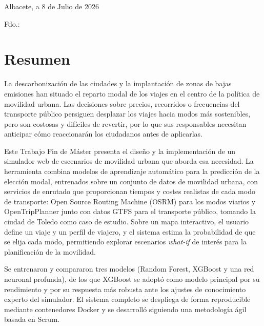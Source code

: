 \vspace*{2cm}
\begin{center}
Albacete, a 8 de Julio de 2026

\vskip3cm

Fdo.: \autor
\end{center}


\cleardoublepage
\thispagestyle{plain}
\chapter*{Resumen}

La descarbonización de las ciudades y la implantación de zonas de bajas emisiones han situado el reparto modal de los viajes en el centro de la política de movilidad urbana. Las decisiones sobre precios, recorridos o frecuencias del transporte público persiguen desplazar los viajes hacia modos más sostenibles, pero son costosas y difíciles de revertir, por lo que sus responsables necesitan anticipar cómo reaccionarán los ciudadanos antes de aplicarlas.

Este Trabajo Fin de Máster presenta el diseño y la implementación de un simulador web de escenarios de movilidad urbana que aborda esa necesidad. La herramienta combina modelos de aprendizaje automático para la predicción de la elección modal, entrenados sobre un conjunto de datos de movilidad urbana, con servicios de enrutado que proporcionan tiempos y costes realistas de cada modo de transporte: Open Source Routing Machine (OSRM) para los modos viarios y OpenTripPlanner junto con datos GTFS para el transporte público, tomando la ciudad de Toledo como caso de estudio. Sobre un mapa interactivo, el usuario define un viaje y un perfil de viajero, y el sistema estima la probabilidad de que se elija cada modo, permitiendo explorar escenarios \textit{what-if} de interés para la planificación de la movilidad.

Se entrenaron y compararon tres modelos (Random Forest, XGBoost y una red neuronal profunda), de los que XGBoost se adoptó como modelo principal por su rendimiento y por su respuesta más robusta ante los ajustes de conocimiento experto del simulador. El sistema completo se despliega de forma reproducible mediante contenedores Docker y se desarrolló siguiendo una metodología ágil basada en Scrum.


